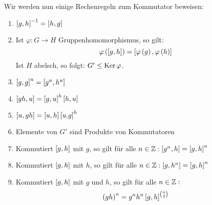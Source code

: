 \begin{lemma}[Rechenregeln]
\label{kommutator_rechenregeln}
 Wir werden nun einige Rechenregeln zum Kommutator beweisen:
 \begin{enumerate}
  \item \label{kommutator_inverses_element} $\left[g,h\right]^{-1}=\left[h,g\right]$
  \item Ist $ \varphi: G \to H$ Gruppenhomomorphismus, so gilt:
   \begin{equation*}
    \varphi \left(\left[ g,h \right]\right) = \left[\varphi\left(g\right), \varphi\left(h\right)\right]
   \end{equation*}
   Ist $H$ abelsch, so folgt: $G' \leq \operatorname{Ker}\varphi$.
  \item $\left[g,g\right]^u = \left[g^u, h^u\right]$
  \item $\left[gh,u\right] = \left[g,u\right]^h \left[h,u\right]$
  \item $\left[u,gh\right] = \left[u,h\right]\left[u.g\right]^h$
  \item Elemente von $G'$ sind Produkte von Kommutatoren
  \item Kommutiert $\left[g,h\right]$ mit $g$, so gilt f\"ur alle $n \in \mathbb{Z}: \left[g^n,h\right] = \left[g,h\right]^n$
  \item Kommutiert $\left[g,h\right]$ mit $h$, so gilt f\"ur alle $n \in \mathbb{Z}: \left[g,h^n\right] = \left[g,h\right]^n$
  \item Kommutiert $\left[g,h\right]$ mit $g$ und $h$, so gilt f\"ur alle $n \in \mathbb{Z}:$
   \begin{equation*}
    \left(gh\right)^n = g^nh^n\left[g,h\right]^{\binom{n}{2}}
   \end{equation*}
\end{enumerate}
\end{lemma}

